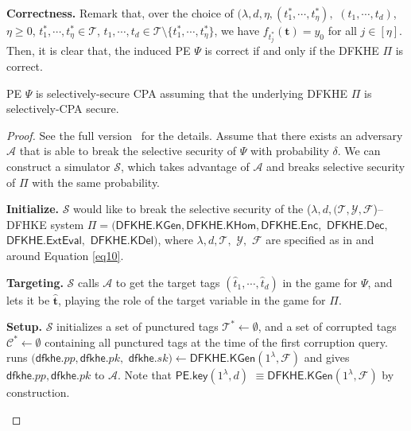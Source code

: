 \documentclass[runningheads,10pt]{llncs}
\begin{document}
\noindent \textbf{Correctness.}  Remark that, over the choice of  $(\lambda, d, \eta,  (t^*_1, \cdots, t^*_\eta),$ $ (t_1, \cdots, t_d)$,  $\eta\geq 0$, $t^*_1, \cdots, t^*_\eta \in \mathcal{T}$, $t_1, \cdots, t_d \in \mathcal{T}\setminus \{t^*_1, \cdots, t^*_\eta\}$, we have  $f_{t^*_j}(\mathbf{t})=y_0$ for all $j\in [\eta].$ Then, it is clear that, the induced PE $\Psi$ is correct if  and only if the DFKHE $\Pi$ is correct.


\begin{theorem} \label{pe}
PE $\Psi$ is selectively-secure CPA assuming that 
the underlying DFKHE $\Pi$ is selectively-CPA secure.
\end{theorem}

\begin{proof} \label{peproof}
	See the full version~\cite{fullversion} for the details.
\iffalse	
	Assume that there exists an adversary $\mathcal{A}$ that is able to break the selective security of $\Psi$ 
	with probability $\delta$. We can construct a simulator $\mathcal{S}$, which takes advantage of  $\mathcal{A}$ 
	and breaks selective security of $\Pi$ with the same probability. 
	\begin{description}
		\item \textbf{Initialize.} $\mathcal{S}$ would like to break the selective security of the   ($\lambda, d, (\mathcal{T}, \mathcal{Y}, \mathcal{F}$)--DFHKE system $\Pi=( \mathsf{DFKHE.KGen},  \mathsf{DFKHE.KHom},  \mathsf{DFKHE.Enc},$ $ \mathsf{DFKHE.Dec} ,$  $ \mathsf{DFKHE.ExtEval}, $ $\mathsf{DFKHE.KDel})$, 
		where  $\lambda, d, \mathcal{T}, $ $\mathcal{Y},$ $ \mathcal{F}$ are specified as in and around Equation \eqref{eq10}.
		
		\item \textbf{Targeting.} $\mathcal{S}$ calls $\mathcal{A}$ to get  the target tags  $(\widehat{t}_1, \cdots, \widehat{t}_d)$ in the game for $\Psi$, and lets it be $\widehat{\mathbf{t}}$, playing the role of the target variable in the game for $\Pi$.
		
		\item \textbf{Setup.} $\mathcal{S}$ initializes a set of punctured tags $\mathcal{T}^* \leftarrow \emptyset$, 
	and a set of corrupted tags $\mathcal{C}^* \leftarrow \emptyset$ containing all punctured tags at the time of the first corruption query.  runs $(\mathsf{dfkhe}.pp, \mathsf{dfkhe}.pk, $ $\mathsf{dfkhe}.sk) \leftarrow \mathsf{DFKHE.KGen}(1^\lambda, \mathcal{F})$ and gives $\mathsf{dfkhe}.pp, \mathsf{dfkhe}.pk$ to $\mathcal{A}$.  Note that $ \mathsf{PE.key}(1^\lambda, d)$  $\equiv \mathsf{DFKHE.KGen}(1^\lambda, \mathcal{F})$ by construction.
		

\end{description}
\end{proof}
\end{document}

